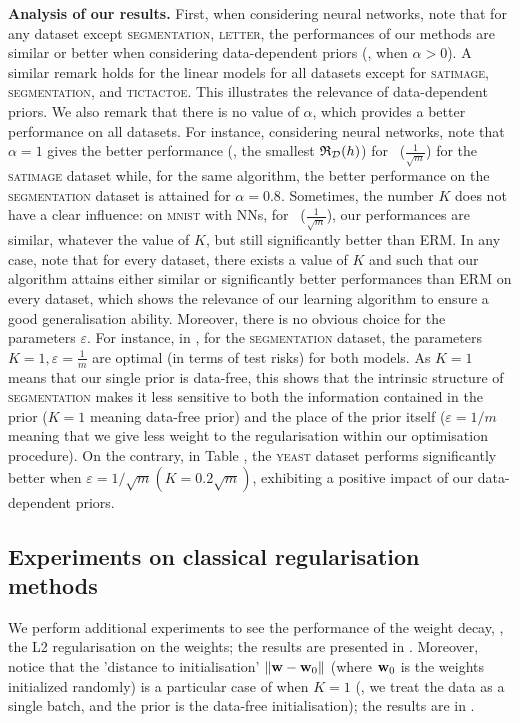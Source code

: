 \begin{noaddcontents}
    
    \textbf{Analysis of our results.}
    First, when considering neural networks, note that for any dataset except \textsc{segmentation}, \textsc{letter}, the performances of our methods are similar or better when considering data-dependent priors (\ie, when $\alpha >0$).
    A similar remark holds for the linear models for all datasets except for \textsc{satimage}, \textsc{segmentation}, and \textsc{tictactoe}. This illustrates the relevance of data-dependent priors.
    We also remark that there is no value of $\alpha$, which provides a better performance on all datasets.
    For instance, considering neural networks, note that $\alpha=1$ gives the better performance (\ie, the smallest $\mathfrak{R}_{\mathcal{D}}(h)$) for ~($\frac{1}{\sqrt{m}}$) for the \textsc{satimage} dataset while, for the same algorithm, the better performance on the \textsc{segmentation} dataset is attained for $\alpha=0.8$. 
    Sometimes, the number $K$ does not have a clear influence: on \textsc{mnist} with NNs, for ~($\frac{1}{\sqrt{m}}$), our performances are similar, whatever the value of $K$, but still significantly better than ERM.
    In any case, note that for every dataset, there exists a value of $K$ and such that our algorithm attains either similar or significantly better performances than ERM on every dataset, which shows the relevance of our learning algorithm to ensure a good generalisation ability.
    Moreover, there is no obvious choice for the parameters $\varepsilon$.
    For instance, in , for the \textsc{segmentation} dataset, the parameters $K=1,\varepsilon=\frac{1}{m}$ are optimal (in terms of test risks) for both models. 
    As $K=1$ means that our single prior is data-free, this shows that the intrinsic structure of \textsc{segmentation} makes it less sensitive to both the information contained in the prior ($K=1$ meaning data-free prior) and the place of the prior itself ($\varepsilon=1/m$ meaning that we give less weight to the regularisation within our optimisation procedure).
    On the contrary, in Table , the \textsc{yeast} dataset performs significantly better when $\varepsilon=1/\sqrt{m} (K=0.2\sqrt{m})$, exhibiting a positive impact of our data-dependent priors.
    
    \subsection{Experiments on classical regularisation methods}
    
    We perform additional experiments to see the performance of the weight decay, \ie, the L2 regularisation on the weights; the results are presented in .
    Moreover, notice that the 'distance to initialisation' $\|\mathbf{w}-\mathbf{w}_0\|$ (where $\mathbf{w}_0$ is the weights initialized randomly) is a particular case of  when $K=1$ (\ie, we treat the data as a single batch, and the prior is the data-free initialisation); the results are in .
    

\end{noaddcontents}
